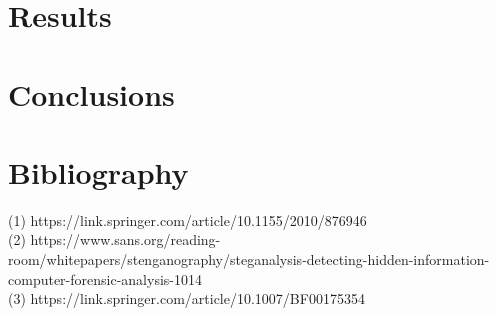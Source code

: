 \documentclass[12pt]{article}
\begin{document}
\section{Results}


\section{Conclusions}

\section{Bibliography}
(1) https://link.springer.com/article/10.1155/2010/876946 \\
(2) https://www.sans.org/reading-room/whitepapers/stenganography/steganalysis-detecting-hidden-information-computer-forensic-analysis-1014 \\
(3) https://link.springer.com/article/10.1007/BF00175354
\end{document}
